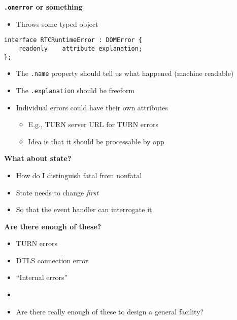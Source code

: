 \documentclass[helvetica]{seminar}
\newcommand{\heading}[1]{%
  \begin{center} 
    \large\bf 
    #1 
  \end{center} 
  \vspace{.4 in}}
\begin{document}
\begin{slide}
\heading{\texttt{.onerror} or something}

\begin{itemize}
\item Throws some typed object
\end{itemize}

\begin{verbatim}
interface RTCRuntimeError : DOMError {
    readonly    attribute explanation;
};
\end{verbatim}

\begin{itemize}
\item The \verb^.name^ property should tell us what happened (machine readable)
\item The \verb^.explanation^ should be freeform
\item Individual errors could have their own attributes
  \begin{itemize}
  \item E.g., TURN server URL for TURN errors
  \item Idea is that it should be processable by app
  \end{itemize}
\end{itemize}
\end{slide}


\begin{slide}
\heading{What about state?}

\begin{itemize}
\item How do I distinguish fatal from nonfatal
\item State needs to change \emph{first}
\item So that the event handler can interrogate it
\end{itemize}

\end{slide}


\begin{slide}
\heading{Are there enough of these?}

\begin{itemize}
\item TURN errors
\item DTLS connection error
\item ``Internal errors''
\item
\item Are there really enough of these to design a general facility?
\end{itemize}

\end{slide}
\end{document}
